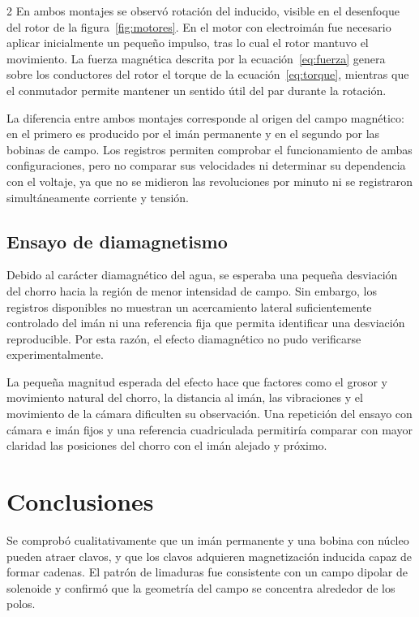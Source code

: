 \documentclass[10pt,letterpaper]{article}
\begin{document}
\begin{multicols}{2}
En ambos montajes se observó rotación del inducido, visible en el desenfoque del rotor de la figura~\ref{fig:motores}. En el motor con electroimán fue necesario aplicar inicialmente un pequeño impulso, tras lo cual el rotor mantuvo el movimiento. La fuerza magnética descrita por la ecuación~\eqref{eq:fuerza} genera sobre los conductores del rotor el torque de la ecuación~\eqref{eq:torque}, mientras que el conmutador permite mantener un sentido útil del par durante la rotación.

La diferencia entre ambos montajes corresponde al origen del campo magnético: en el primero es producido por el imán permanente y en el segundo por las bobinas de campo. Los registros permiten comprobar el funcionamiento de ambas configuraciones, pero no comparar sus velocidades ni determinar su dependencia con el voltaje, ya que no se midieron las revoluciones por minuto ni se registraron simultáneamente corriente y tensión.

\subsection{Ensayo de diamagnetismo}

Debido al carácter diamagnético del agua, se esperaba una pequeña desviación del chorro hacia la región de menor intensidad de campo. Sin embargo, los registros disponibles no muestran un acercamiento lateral suficientemente controlado del imán ni una referencia fija que permita identificar una desviación reproducible. Por esta razón, el efecto diamagnético no pudo verificarse experimentalmente.

La pequeña magnitud esperada del efecto hace que factores como el grosor y movimiento natural del chorro, la distancia al imán, las vibraciones y el movimiento de la cámara dificulten su observación. Una repetición del ensayo con cámara e imán fijos y una referencia cuadriculada permitiría comparar con mayor claridad las posiciones del chorro con el imán alejado y próximo.

\section{Conclusiones}

Se comprobó cualitativamente que un imán permanente y una bobina con núcleo pueden atraer clavos, y que los clavos adquieren magnetización inducida capaz de formar cadenas. El patrón de limaduras fue consistente con un campo dipolar de solenoide y confirmó que la geometría del campo se concentra alrededor de los polos.


\end{multicols}
\end{document}
